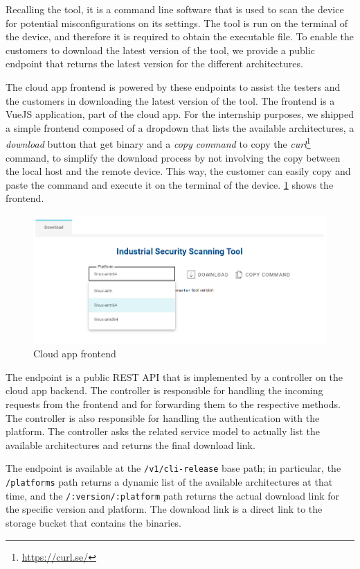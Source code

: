 Recalling the tool, it is a command line software that is used to scan the device for potential misconfigurations on its settings. The tool is run on the terminal of the device, and therefore it is required to obtain the executable file. To enable the customers to download the latest version of the tool, we provide a public endpoint that returns the latest version for the different architectures.

The cloud app frontend is powered by these endpoints to assist the testers and the customers in downloading the latest version of the tool. The frontend is a VueJS application, part of the cloud app. For the internship purposes, we shipped a simple frontend composed of a dropdown that lists the available architectures, a \textit{download} button that get binary and a \textit{copy command} to copy the \textit{curl}\footnote{\url{https://curl.se/}} command, to simplify the download process by not involving the copy between the local host and the remote device. This way, the customer can easily copy and paste the command and execute it on the terminal of the device. \cref{fig:cloud-app-frontend} shows the frontend.

\begin{figure}[h]
  \centering
  \includegraphics[width=1.0\textwidth]{chapters/05/assets/cloud-app-frontend}
  \caption{Cloud app frontend}
  \label{fig:cloud-app-frontend}
\end{figure}

The endpoint is a public REST API that is implemented by a controller on the cloud app backend. The controller is responsible for handling the incoming requests from the frontend and for forwarding them to the respective methods. The controller is also responsible for handling the authentication with the platform. The controller asks the related service model to actually list the available architectures and returns the final download link.

The endpoint is available at the \texttt{/v1/cli-release} base path; in particular, the \texttt{/platforms} path returns a dynamic list of the available architectures at that time, and the \texttt{/:version/:platform} path returns the actual download link for the specific version and platform. The download link is a direct link to the storage bucket that contains the binaries.

